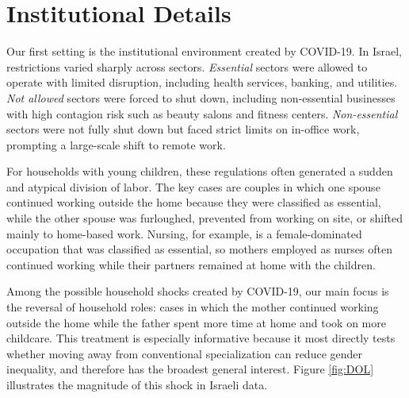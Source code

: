 \documentclass[12pt]{article}
\begin{document}
\section*{Institutional Details}

Our first setting is the institutional environment created by COVID-19. In Israel, restrictions varied sharply across sectors. \textit{Essential} sectors were allowed to operate with limited disruption, including health services, banking, and utilities. \textit{Not allowed} sectors were forced to shut down, including non-essential businesses with high contagion risk such as beauty salons and fitness centers. \textit{Non-essential} sectors were not fully shut down but faced strict limits on in-office work, prompting a large-scale shift to remote work.

For households with young children, these regulations often generated a sudden and atypical division of labor. The key cases are couples in which one spouse continued working outside the home because they were classified as essential, while the other spouse was furloughed, prevented from working on site, or shifted mainly to home-based work. Nursing, for example, is a female-dominated occupation that was classified as essential, so mothers employed as nurses often continued working while their partners remained at home with the children.

Among the possible household shocks created by COVID-19, our main focus is the reversal of household roles: cases in which the mother continued working outside the home while the father spent more time at home and took on more childcare. This treatment is especially informative because it most directly tests whether moving away from conventional specialization can reduce gender inequality, and therefore has the broadest general interest. Figure \ref{fig:DOL} illustrates the magnitude of this shock in Israeli data.
\end{document}
